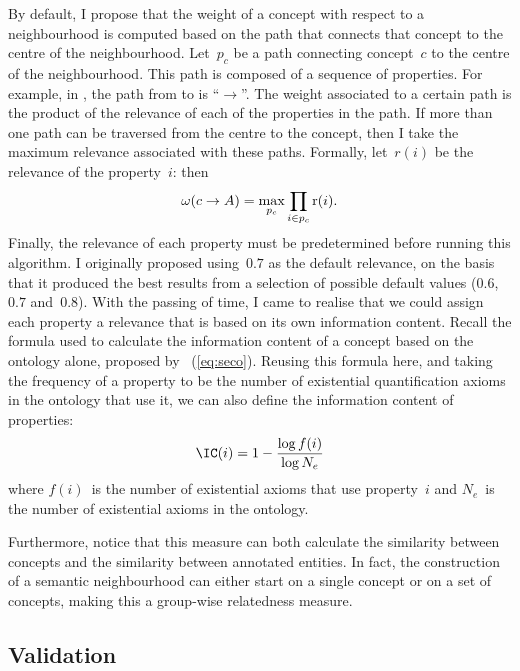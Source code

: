 By default, I propose that the weight of a concept with respect to a neighbourhood is computed based on the path that connects that concept to the centre of the neighbourhood. Let~$p_c$ be a path connecting concept~$c$ to the centre of the neighbourhood. This path is composed of a sequence of properties. For example, in , the path from  to  is ``${}\rightarrow{}$''. The weight associated to a certain path is the product of the relevance of each of the properties in the path. If more than one path can be traversed from the centre to the concept, then I take the maximum relevance associated with these paths. Formally, let~$r(i)$ be the relevance of the property~$i$: then
\begin{equation}
    \omega(c\rightarrow A)=\max_{p_c}\prod_{i \in p_c} \mathrm{r}(i).
    \label{eq:weight}
\end{equation}
Finally, the relevance of each property must be predetermined before running this algorithm. I originally proposed using~$0.7$ as the default relevance, on the basis that it produced the best results from a selection of possible default values ($0.6$, $0.7$ and~$0.8$). With the passing of time, I came to realise that we could assign each property a relevance that is based on its own information content. Recall the formula used to calculate the information content of a concept based on the ontology alone, proposed by \citet{Seco2004}~(\eqref{eq:seco}). Reusing this formula here, and taking the frequency of a property to be the number of existential quantification axioms in the ontology that use it, we can also define the information content of properties:
\begin{equation}
    \IC(i) = 1 - \frac{\log f(i)}{\log N_e}
\end{equation}
where $f(i)$~is the number of existential axioms that use property~$i$ and $N_e$~is the number of existential axioms in the ontology.

Furthermore, notice that this measure can both calculate the similarity between concepts and the similarity between annotated entities. In fact, the construction of a semantic neighbourhood can either start on a single concept or on a set of concepts, making this a group-wise relatedness measure.


\subsection{Validation}

